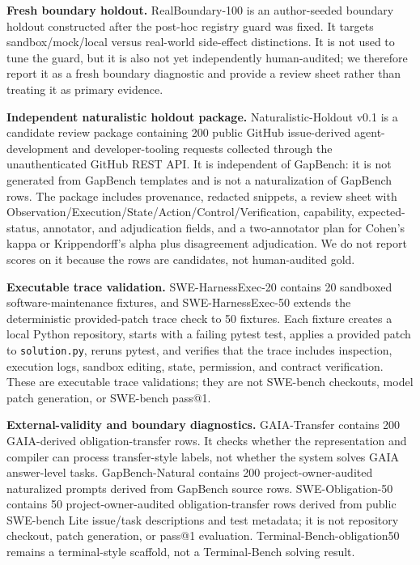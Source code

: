 \documentclass[
  10pt,
]{article}
\begin{document}
\textbf{Fresh boundary holdout.} RealBoundary-100 is an author-seeded
boundary holdout constructed after the post-hoc registry guard was
fixed. It targets sandbox/mock/local versus real-world side-effect
distinctions. It is not used to tune the guard, but it is also not yet
independently human-audited; we therefore report it as a fresh boundary
diagnostic and provide a review sheet rather than treating it as primary
evidence.

\textbf{Independent naturalistic holdout package.} Naturalistic-Holdout
v0.1 is a candidate review package containing 200 public GitHub
issue-derived agent-development and developer-tooling requests collected
through the unauthenticated GitHub REST API. It is independent of
GapBench: it is not generated from GapBench templates and is not a
naturalization of GapBench rows. The package includes provenance,
redacted snippets, a review sheet with
Observation/Execution/State/Action/Control/Verification, capability,
expected-status, annotator, and adjudication fields, and a two-annotator
plan for Cohen's kappa or Krippendorff's alpha plus disagreement
adjudication. We do not report scores on it because the rows are
candidates, not human-audited gold.

\textbf{Executable trace validation.} SWE-HarnessExec-20 contains 20
sandboxed software-maintenance fixtures, and SWE-HarnessExec-50 extends
the deterministic provided-patch trace check to 50 fixtures. Each
fixture creates a local Python repository, starts with a failing pytest
test, applies a provided patch to \texttt{solution.py}, reruns pytest,
and verifies that the trace includes inspection, execution logs, sandbox
editing, state, permission, and contract verification. These are
executable trace validations; they are not SWE-bench checkouts, model
patch generation, or SWE-bench pass@1.

\textbf{External-validity and boundary diagnostics.} GAIA-Transfer
contains 200 GAIA-derived obligation-transfer rows. It checks whether
the representation and compiler can process transfer-style labels, not
whether the system solves GAIA answer-level tasks. GapBench-Natural
contains 200 project-owner-audited naturalized prompts derived from
GapBench source rows. SWE-Obligation-50 contains 50
project-owner-audited obligation-transfer rows derived from public
SWE-bench Lite issue/task descriptions and test metadata; it is not
repository checkout, patch generation, or pass@1 evaluation.
Terminal-Bench-obligation50 remains a terminal-style scaffold, not a
Terminal-Bench solving result.
\end{document}
